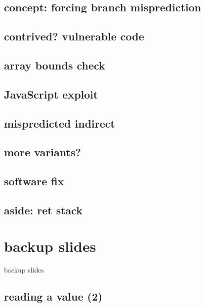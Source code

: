 \subsection{concept: forcing branch misprediction}


\subsection{contrived? vulnerable code}


\subsection{array bounds check}


\subsection{JavaScript exploit}


\subsection{mispredicted indirect}


\subsection{more variants?}


\subsection{software fix}


\subsection{aside: ret stack}



\section{backup slides}
\begin{frame}{backup slides}
\end{frame}
\subsection{reading a value (2)}



